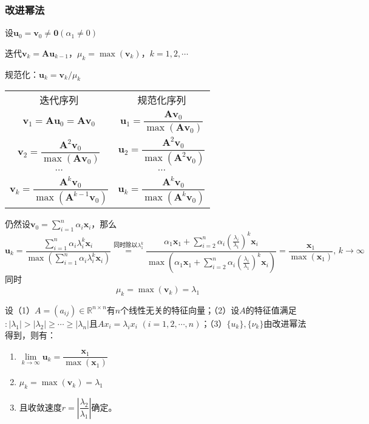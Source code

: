 \subsubsection{改进幂法}
设$\boldsymbol{u}_0=\boldsymbol{v}_0\neq \boldsymbol{0}(\alpha_1\neq0)$

迭代$\boldsymbol{v}_k= \boldsymbol{Au}_{k-1}$，$\mu _{k}= \max ( \boldsymbol{v}_{k})$，$k= 1, 2, \cdots$

规范化：$\boldsymbol{u}_k=\boldsymbol{v}_k/\mu_k$

\begin{table}[htbp]
    \centering
    \begin{tabular}{cc}
        迭代序列 & 规范化序列 \\
        $\boldsymbol{v}_{1} = \boldsymbol{Au}_{0} =  \boldsymbol{Av}_{0}$ & $\boldsymbol{u}_{1} = \dfrac{\boldsymbol{Av}_{0}}{\max(\boldsymbol{Av}_{0})}$ \\
        $\boldsymbol{v}_{2} = \dfrac{\boldsymbol{A}^{2}\boldsymbol{v}_{0}}{\max(\boldsymbol{Av}_{0})}$ & $\boldsymbol{u}_{2} = \dfrac{\boldsymbol{A}^{2}\boldsymbol{v}_{0}}{\max(\boldsymbol{A}^{2}\boldsymbol{v}_{0})}$ \\
        $\cdots$ & $\cdots$ \\
        $\boldsymbol{v}_{k} = \dfrac{\boldsymbol{A}^{k}\boldsymbol{v}_{0}}{\max(\boldsymbol{A}^{k-1}\boldsymbol{v}_{0})}$ & $\boldsymbol{u}_{k} = \dfrac{\boldsymbol{A}^{k}\boldsymbol{v}_{0}}{\max(\boldsymbol{A}^{k}\boldsymbol{v}_{0})}$ \\
    \end{tabular}%
\end{table}%
仍然设$\boldsymbol{v}_0 = \sum\limits_{i = 1}^{n}\alpha_{i} \boldsymbol{x}_{i}$，那么
\[
    \boldsymbol{u}_{k} = \dfrac{\sum\limits_{i = 1}^{n}\alpha_i \lambda_{i}^{k}\boldsymbol{x}_{i}}{\max\left( \sum\limits_{i = 1}^{n}\alpha_i \lambda_{i}^{k}\boldsymbol{x}_{i} \right)} \overset{\text{同时除以}\lambda_{1}^{k}}{=} \dfrac{\alpha_1 \boldsymbol{x}_{1}+\sum\limits_{i = 2}^{n}\alpha_i (\frac{\lambda_{i}}{\lambda_{1}})^{k}\boldsymbol{x}_{i}}{\max\left(\alpha_1 \boldsymbol{x}_{1}+ \sum\limits_{i = 2}^{n}\alpha_i (\frac{\lambda_{i}}{\lambda_{1}})^{k} \boldsymbol{x}_{i} \right)} = \dfrac{\boldsymbol{x}_{1}}{\max\left( \boldsymbol{x}_{1} \right)},\,k\to\infty 
\]
同时
\[
    \mu_{k} = \max\left( \boldsymbol{v}_{k} \right) = \lambda_1
\]
\begin{theorem}[改进幂法]
    设（1）$A=(a_{ij})\in\mathbb{R}^{n\times n}$有$n$个线性无关的特征向量；（2）设$A$的特征值满足$:|\lambda_1|>|\lambda_2|\geq\cdots\geq|\lambda_n|$且$ Ax_{i}= \lambda _{i}x_{i}$ $( i= 1, 2, \cdots , n)$；（3）$\{u_{k}\},\{\nu_{k}\}$由改进幂法得到，则有：
    \begin{enumerate}
        \item $\lim\limits_{k\to \infty}\boldsymbol{u}_{k} = \dfrac{\boldsymbol{x}_{1}}{\max\left( \boldsymbol{x}_{1} \right)}$
        \item $\mu_{k} = \max\left( \boldsymbol{v}_{k} \right) = \lambda_1$
        \item 且收敛速度$r = \left|\dfrac{\lambda_2}{\lambda_1}\right|$确定。
    \end{enumerate}
\end{theorem}
